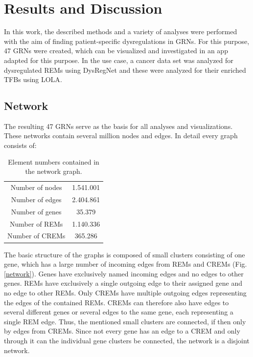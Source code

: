 \documentclass[pdftex,12pt,a4paper]{report}
\begin{document}
\chapter{Results and Discussion}
In this work, the described methods and a variety of analyses were performed with the aim of finding patient-specific dysregulations in GRNs. For this purpose, 47 GRNs were created, which can be visualized and investigated in an app adapted for this purpose. In the use case, a cancer data set was analyzed for dysregulated REMs using DysRegNet\cite{dysregnet} and these were analyzed for their enriched TFBs using LOLA\cite{LOLA}. 
\section{Network}
The resulting 47 GRNs serve as the basis for all analyses and visualizations. These networks contain several million nodes and edges. In detail every graph consists of:

\renewcommand{\arraystretch}{2}
\begin{table}[!ht]
\centering
\begin{tabular}{|c|c|}
\hline
Number of nodes		& 1.541.001		\\
Number of edges		& 2.404.861		\\
Number of genes		& 35.379        \\
Number of REMs		& 1.140.336		\\
Number of CREMs		& 365.286      	\\
\hline
\end{tabular}
\caption{Element numbers contained in the network graph.}
\label{numbers}
\end{table}
\renewcommand{\arraystretch}{1}
The basic structure of the graphs is composed of small clusters consisting of one gene, which has a large number of incoming edges from REMs and CREMs (Fig. \ref{network}). Genes have exclusively named incoming edges and no edges to other genes. REMs have exclusively a single outgoing edge to their assigned gene and no edge to other REMs. Only CREMs have multiple outgoing edges representing the edges of the contained REMs. CREMs can therefore also have edges to several different genes or several edges to the same gene, each representing a single REM edge. Thus, the mentioned small clusters are connected, if then only by edges from CREMs. Since not every gene has an edge to a CREM and only through it can the individual gene clusters be connected, the network is a disjoint network.
 
\end{document}
